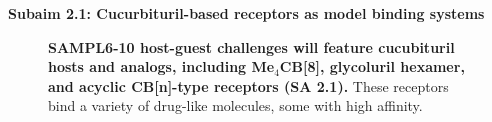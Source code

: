 \documentclass[11pt]{article}
\begin{document}


\textbf{Subaim 2.1: Cucurbituril-based receptors as model binding systems}

\begin{figure}[h]
\begin{centering}

\end{centering}

\caption{
\label{figure:CB} \footnotesize {\bf SAMPL6-10 host-guest challenges will feature cucubituril hosts and analogs, including Me$_4$CB[8], glycoluril hexamer, and acyclic CB[n]-type receptors (SA 2.1).} 
These receptors bind a variety of drug-like molecules, some with high affinity.
\vspace{-0.2in}
}
\end{figure}
\end{document}
